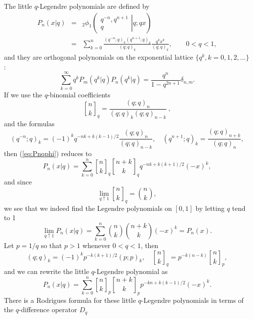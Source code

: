 \documentclass[12pt]{article}
\DeclareRobustCommand{\qbinom}{\genfrac[]{0pt}{}}
\begin{document}
The little $q$-Legendre polynomials are defined by
\begin{eqnarray}   \label{eq:Pnqphi}
  P_n(x|q) & = & {}_2\phi_1 \left(  \left. 
     \begin{array}{c} q^{-n} , q^{n+1} \\ q \end{array}
      \right| q ; qx \right)   \nonumber \\
      & = & \sum_{k=0}^n \frac{ (q^{-n};q)_k (q^{n+1};q)_k}{(q;q)_k}
        \frac{q^k x^k}{(q;q)_k}, \qquad  0 < q < 1,
\end{eqnarray}    
and they are orthogonal polynomials on the exponential lattice
$\{ q^k, k=0,1,2,\ldots\}$:
\begin{equation}   \label{eq:Pnorth}
  \sum_{k=0}^\infty  q^k P_m(q^k|q) P_n(q^k|q) = 
  \frac{q^n}{1-q^{2n+1}} \delta_{n,m}. 
\end{equation}
If we use the $q$-binomial coefficients
\begin{equation}  \label{eq:qbinom}
  \qbinom{n}{k}_q = \frac{(q;q)_n}{(q;q)_k(q;q)_{n-k}} \ ,
\end{equation}
and the formulas
\begin{equation}  \label{eq:qminplus}
  (q^{-n};q)_k = (-1)^k q^{-nk+k(k-1)/2} \frac{(q;q)_n}{(q;q)_{n-k}}, 
  \quad 
  (q^{n+1};q)_k = \frac{(q;q)_{n+k}}{(q;q)_n}, 
\end{equation}
then (\ref{eq:Pnqphi}) reduces to
\begin{equation}  \label{eq:Pnqbinom}
  P_n(x|q) = \sum_{k=0}^n \qbinom{n}{k}_q \qbinom{n+k}{k}_q 
   q^{-nk+k(k+1)/2} (-x)^k,
\end{equation}     
and since 
\[  \lim_{q \uparrow 1}  \qbinom{n}{k}_q = \binom{n}{k}, \]
we see that we indeed find the Legendre polynomials on
$[0,1]$ by letting $q$ tend to 1
\[    \lim_{q \uparrow 1} P_n(x|q) = 
   \sum_{k=0}^n \binom{n}{k} \binom{n+k}{k}  (-x)^k = P_n(x). \]
Let $p = 1/q$ so that $p > 1$ whenever $0 < q < 1$, then
\begin{equation} \label{eq:qtop}
   (q;q)_k = (-1)^k p^{-k(k+1)/2} (p;p)_k, \quad
   \qbinom{n}{k}_q = p^{-k(n-k)} \qbinom{n}{k}_p,
\end{equation}
and we can rewrite the little $q$-Legendre polynomial as
\begin{equation}  \label{eq:Pnpbinom}
  P_n(x|q) = \sum_{k=0}^n \qbinom{n}{k}_p \qbinom{n+k}{k}_p
    p^{-kn+k(k-1)/2} (-x)^k.
\end{equation}
There is a Rodrigues formula for these little $q$-Legendre
polynomials in terms of the $q$-difference operator $D_q$
\end{document}

